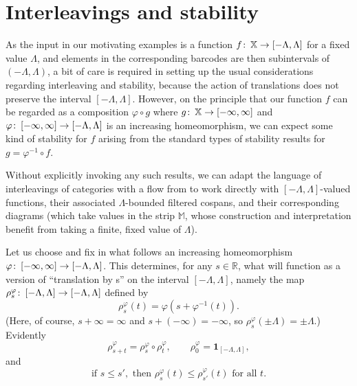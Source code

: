 \documentclass[11pt]{amsart}
\theoremstyle{definition}
\theoremstyle{remark}
\numberwithin{equation}{section}
\def\co{\colon\thinspace}
\def\R{\mathbb{R}}
\begin{document}
\section{Interleavings and stability}\label{stabsect}

As the input in our motivating examples is a function $f\co \mathbb{X}\to [-\Lambda,\Lambda]$ for a fixed value $\Lambda$, and elements in the corresponding barcodes are then subintervals of $(-\Lambda,\Lambda)$,  a bit of care is required in setting up the usual considerations regarding interleaving and stability, because the action of translations does not preserve the interval $[-\Lambda,\Lambda]$.  However, on the principle that our function $f$ can  be regarded as a composition $\varphi\circ g$ where $g\co \mathbb{X}\to [-\infty,\infty]$ and $\varphi\co [-\infty,\infty]\to [-\Lambda,\Lambda]$ is an increasing homeomorphism, we can expect some kind of stability for $f$ arising from the standard types of stability results for $g=\varphi^{-1}\circ f$.

Without explicitly invoking any such results, we can adapt the language of interleavings of categories with a flow from \cite{dSMS} to work directly with $[-\Lambda,\Lambda]$-valued functions, their associated $\Lambda$-bounded filtered cospans, and their corresponding diagrams (which take values in the strip $\mathbb{M}$, whose construction and interpretation benefit from taking a finite, fixed value of $\Lambda$). 

Let us choose and fix in what follows an increasing homeomorphism $\varphi\co [-\infty,\infty]\to [-\Lambda,\Lambda]$. This determines, for any $s\in \R$, what will function as a version of  ``translation by s'' on the interval $[-\Lambda,\Lambda]$, namely the map $\rho^{\varphi}_s\co [-\Lambda,\Lambda]\to[-\Lambda,\Lambda]$ defined by \[ \rho^{\varphi}_{s}(t)=\varphi\left(s+\varphi^{-1}(t)\right).\] (Here, of course, $s+\infty=\infty$ and $s+(-\infty)=-\infty$, so $\rho^{\varphi}_{s}(\pm\Lambda)=\pm\Lambda$.)  Evidently \begin{equation}\label{rhofunct} \rho^{\varphi}_{s+t}=\rho^{\varphi}_{s}\circ\rho^{\varphi}_{t},\qquad \rho^{\varphi}_{0}=\mathbf{1}_{[-\Lambda,\Lambda]},\end{equation} and \begin{equation}\label{monotone} \mbox{if }s\leq s',\mbox{ then }\rho^{\varphi}_{s}(t)\leq \rho_{s'}^{\varphi}(t)\mbox{ for all }t.\end{equation}
\end{document}
